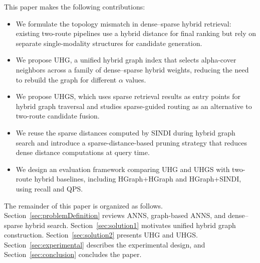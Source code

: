 This paper makes the following contributions:
\begin{itemize}[leftmargin=*]
    \item We formulate the topology mismatch in dense--sparse hybrid retrieval: existing two-route pipelines use a hybrid distance for final ranking but rely on separate single-modality structures for candidate generation.
    \item We propose UHG, a unified hybrid graph index that selects alpha-cover neighbors across a family of dense--sparse hybrid weights, reducing the need to rebuild the graph for different $\alpha$ values.
    \item We propose UHGS, which uses sparse retrieval results as entry points for hybrid graph traversal and studies sparse-guided routing as an alternative to two-route candidate fusion.
    \item We reuse the sparse distances computed by SINDI during hybrid graph search and introduce a sparse-distance-based pruning strategy that reduces dense distance computations at query time.
    \item We design an evaluation framework comparing UHG and UHGS with two-route hybrid baselines, including HGraph+HGraph and HGraph+SINDI, using recall and QPS.
\end{itemize}

The remainder of this paper is organized as follows. Section~\ref{sec:problemDefinition} reviews ANNS, graph-based ANNS, and dense--sparse hybrid search. Section~\ref{sec:solution1} motivates unified hybrid graph construction. Section~\ref{sec:solution2} presents UHG and UHGS. Section~\ref{sec:experimental} describes the experimental design, and Section~\ref{sec:conclusion} concludes the paper.
